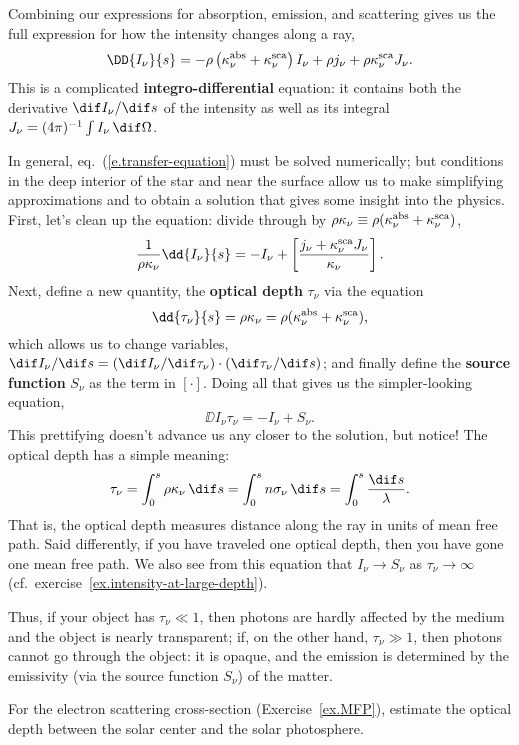 Combining our expressions for absorption, emission, and scattering gives us the full expression for how the intensity changes along a ray,
\begin{equation}\label{e.transfer-equation}
\DD{I_{\nu}}{s} = -\rho\left(\kapabs + \kapscat\right) I_{\nu} + \rho j_{\nu} + \rho\kapscat J_{\nu}.
\end{equation}
This is a complicated \textbf{integro-differential} equation: it contains both the derivative $\dif I_{\nu}/\dif s$ of the intensity as well as its integral $J_{\nu} = (4\pi)^{-1}\int I_{\nu}\,\dif\Omega$.

In general, eq.~(\ref{e.transfer-equation}) must be solved numerically; but conditions in the deep interior of the star and near the surface allow us to make simplifying approximations and to obtain a solution that gives some insight into the physics. First, let's clean up the equation: divide through by $\rho\kappa_{\nu}\equiv\rho(\kappa_\nu^{\mathrm{abs}} + \kappa_\nu^{\mathrm{sca}})$,
\[
	\frac{1}{\rho\kappa_{\nu}}\dd{I_{\nu}}{s} = -I_{\nu} + \left[\frac{j_{\nu} + \kapscat J_{\nu}}{\kappa_{\nu}}\right].
\]
Next, define a new quantity, the \textbf{optical depth} $\tau_{\nu}$ via the equation
\[
	\dd{\tau_{\nu}}{s} = \rho\kappa_{\nu} = \rho(\kapabs+\kapscat),
\]
which allows us to change variables, $\dif I_{\nu}/\dif s = (\dif I_{\nu}/\dif\tau_{\nu})\cdot(\dif\tau_{\nu}/\dif s)$; and finally define the \textbf{source function} $S_{\nu}$ as the term in $\left[\cdot\right]$. Doing all that gives us the simpler-looking equation,
\[
	\DD{I_{\nu}}{\tau_{\nu}} = -I_{\nu} + S_{\nu}.
\]
This prettifying doesn't advance us any closer to the solution, but notice! The optical depth has a simple meaning:
\[
	\tau_{\nu} = \int_{0}^{s} \rho\kappa_{\nu}\,\dif s = \int_{0}^{s} n\sigma_{\nu}\,\dif s = \int_{0}^{s} \frac{\dif s}{\lambda}.
\]
That is, the optical depth measures distance along the ray in units of mean free path. Said differently, if you have traveled one optical depth, then you have gone one mean free path. We also see from this equation that $I_{\nu}\to S_{\nu}$ as $\tau_{\nu}\to\infty$ (cf.\ exercise~\ref{ex.intensity-at-large-depth}).

Thus, if your object has $\tau_{\nu}\ll 1$, then photons are hardly affected by the medium and the object is nearly transparent; if, on the other hand, $\tau_{\nu} \gg 1$, then photons cannot go through the object: it is opaque, and the emission is determined by the emissivity (via the source function $S_{\nu}$) of the matter.

\begin{exercisebox}
For the electron scattering cross-section (Exercise~\ref{ex.MFP}), estimate the optical depth between the solar center and the solar photosphere.
\end{exercisebox}

